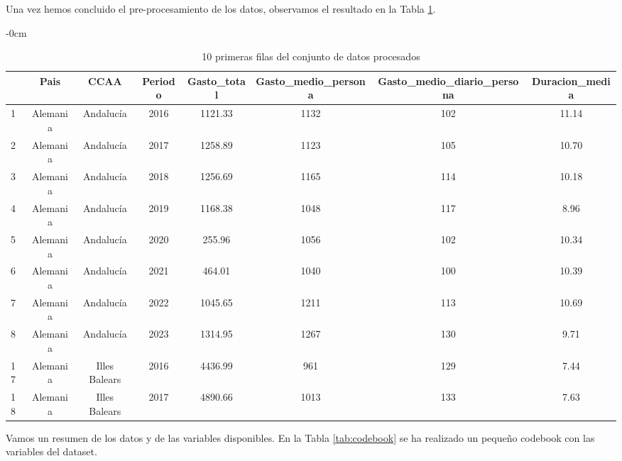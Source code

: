 \documentclass[data,article,submit,moreauthors,pdftex]{Definitions/mdpi}
\begin{document}
Una vez hemos concluido el pre-procesamiento de los datos, observamos el
resultado en la Tabla \ref{tab:unnamed-chunk-27}.

\begin{table}[H]

\caption{\label{tab:unnamed-chunk-27} 10 primeras filas del conjunto de datos procesados}
             \begin{adjustwidth}{-\extralength}{0cm}
             \small
\begin{tabular}[t]{lccccccc}
\toprule
  & Pais & CCAA & Periodo & Gasto\_total & Gasto\_medio\_persona & Gasto\_medio\_diario\_persona & Duracion\_media\\
\midrule
1 & Alemania & Andalucía & 2016 & 1121.33 & 1132 & 102 & 11.14\\
2 & Alemania & Andalucía & 2017 & 1258.89 & 1123 & 105 & 10.70\\
3 & Alemania & Andalucía & 2018 & 1256.69 & 1165 & 114 & 10.18\\
4 & Alemania & Andalucía & 2019 & 1168.38 & 1048 & 117 & 8.96\\
5 & Alemania & Andalucía & 2020 & 255.96 & 1056 & 102 & 10.34\\
6 & Alemania & Andalucía & 2021 & 464.01 & 1040 & 100 & 10.39\\
7 & Alemania & Andalucía & 2022 & 1045.65 & 1211 & 113 & 10.69\\
8 & Alemania & Andalucía & 2023 & 1314.95 & 1267 & 130 & 9.71\\
17 & Alemania & Illes Balears & 2016 & 4436.99 & 961 & 129 & 7.44\\
18 & Alemania & Illes Balears & 2017 & 4890.66 & 1013 & 133 & 7.63\\
\bottomrule
\end{tabular}
    \end{adjustwidth}
\end{table}

Vamos un resumen de los datos y de las variables disponibles. En la
Tabla \ref{tab:codebook} se ha realizado un pequeño codebook con las
variables del dataset.
\end{document}
